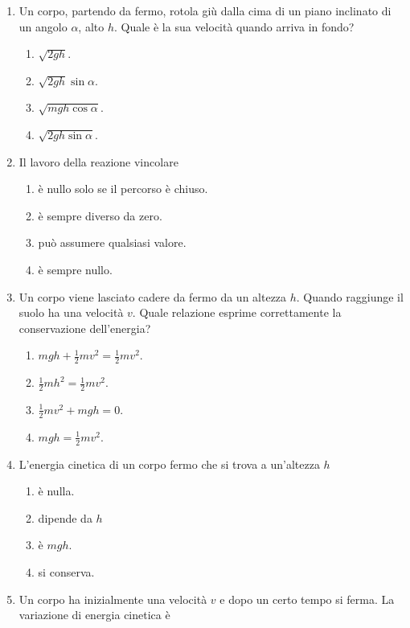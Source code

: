 \documentclass{article}
\begin{document}
\begin{enumerate}
  \item Un corpo, partendo da fermo, rotola giù dalla cima di un piano inclinato di un angolo $\alpha$, alto $h$. Quale è la sua velocità quando arriva in fondo?
  \begin{enumerate}[label=\Alph*.]
    \item $\sqrt{2gh}$.
    \item $\sqrt{2gh}\sin\alpha$.
    \item $\sqrt{mgh\cos\alpha}$.
    \item $\sqrt{2gh\sin\alpha}$.
  \end{enumerate}
  \item Il lavoro della reazione vincolare
  \begin{enumerate}[label=\Alph*.]
    \item è nullo solo se il percorso è chiuso.
    \item è sempre diverso da zero.
    \item può assumere qualsiasi valore.
    \item è sempre nullo.
  \end{enumerate}
  \item Un corpo viene lasciato cadere da fermo da un altezza $h$. Quando raggiunge il suolo ha una velocità $v$. Quale relazione esprime correttamente la conservazione dell'energia?
  \begin{enumerate}[label=\Alph*.]
    \item $mgh+\frac{1}{2}mv^2=\frac{1}{2}mv^2.$
    \item $\frac{1}{2}mh^2=\frac{1}{2}mv^2$.
    \item $\frac{1}{2}mv^2+mgh=0.$
    \item $mgh=\frac{1}{2}mv^2$.
  \end{enumerate}
  \item L'energia cinetica di un corpo fermo che si trova a un'altezza $h$
  \begin{enumerate}[label=\Alph*.]
    \item è nulla.
    \item dipende da $h$
    \item è $mgh$.
    \item si conserva.
  \end{enumerate}
  \item Un corpo ha inizialmente una velocità $v$ e dopo un certo tempo si ferma. La variazione di energia cinetica è
  \begin{enumerate}[label=\Alph*.]

\end{enumerate}
\end{enumerate}
\end{document}
